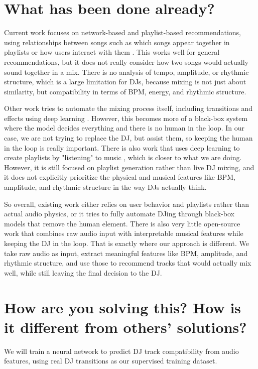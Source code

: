 \documentclass[10pt]{article}
\begin{document}
\section{What has been done already?}

 Current work focuses on network-based and playlist-based recommendations, using relationships between songs such as which songs appear together in playlists or how users interact with them \cite{aljanaki2017}. This works well for general recommendations, but it does not really consider how two songs would actually sound together in a mix. There is no analysis of tempo, amplitude, or rhythmic structure, which is a large limitation for DJs, because mixing is not just about similarity, but compatibility in terms of BPM, energy, and rhythmic structure.
 
 Other work tries to automate the mixing process itself, including transitions and effects using deep learning \cite{arxiv2021}. However, this becomes more of a black-box system where the model decides everything and there is no human in the loop. In our case, we are not trying to replace the DJ, but assist them, so keeping the human in the loop is really important. There is also work that uses deep learning to create playlists by "listening" to music \cite{mer}, which is closer to what we are doing. However, it is still focused on playlist generation rather than live DJ mixing, and it does not explicitly prioritize the physical and musical features like BPM, amplitude, and rhythmic structure in the way DJs actually think.
 
 So overall, existing work either relies on user behavior and playlists rather than actual audio physics, or it tries to fully automate DJing through black-box models that remove the human element. There is also very little open-source work that combines raw audio input with interpretable musical features while keeping the DJ in the loop. That is exactly where our approach is different. We take raw audio as input, extract meaningful features like BPM, amplitude, and rhythmic structure, and use those to recommend tracks that would actually mix well, while still leaving the final decision to the DJ.

\section{How are you solving this? How is it different from others' solutions?}

 We will train a neural network to predict DJ track compatibility from audio features, using real DJ transitions as our supervised training dataset. 
\end{document}
